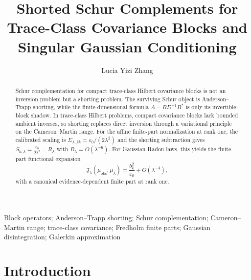 \documentclass[preprint,12pt]{elsarticle}
\theoremstyle{plain}
\theoremstyle{definition}
\theoremstyle{remark}
\begin{document}
\begin{frontmatter}

\title{Shorted Schur Complements for Trace-Class Covariance Blocks and Singular Gaussian Conditioning}

\author[inst1]{Lucia Yizi Zhang}


\begin{abstract}
        Schur complementation for compact trace-class Hilbert covariance blocks
        is not an inversion problem but a shorting problem.  The surviving Schur
        object is Anderson--Trapp shorting, while the finite-dimensional formula
        $A-BD^{-1}B^*$ is only its invertible-block shadow.  In trace-class
        Hilbert problems, compact covariance blocks lack bounded ambient inverses,
        so shorting replaces direct inversion through a variational principle on
        the Cameron--Martin range.  For the affine finite-part normalization at rank one, the calibrated scaling is
        $\Sigma_{\lambda,kk}=\varepsilon_0/(2\lambda^2)$ and the shorting
        subtraction gives $S_{k,\lambda}=\frac{\varepsilon_0}{2\lambda^2}-R_\lambda$
        with $R_\lambda=O(\lambda^{-6})$.
        For Gaussian Radon laws, this yields the finite-part functional expansion
        \[
        \mathfrak{J}_\lambda(\mu_{\mathrm{obs}};\mu_\lambda)
        =
        \frac{b_k^2}{\varepsilon_0}+O(\lambda^{-4}),
        \]
        with a canonical evidence-dependent finite part at rank one.
    \end{abstract}

    \begin{keyword}
Block operators; Anderson--Trapp shorting; Schur complementation; Cameron--Martin range; trace-class covariance; Fredholm finite parts; Gaussian disintegration; Galerkin approximation
\end{keyword}

\end{frontmatter}

    \section{Introduction}
    \label{sec:intro}
\end{document}
